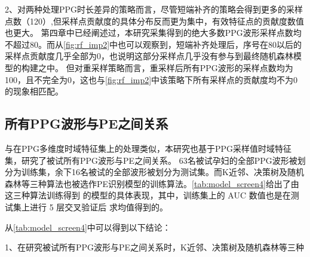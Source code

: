 2、对两种处理PPG时长差异的策略而言，尽管短端补齐的策略会得到更多的采样点数（120）,但采样点贡献度的具体分布反而更为集中，有效特征点的贡献度数值也更大。
第四章中已经阐述过，本研究采集得到的绝大多数PPG波形采样点数均不超过80。而从\autoref{fig:rf_imp2}中也可以观察到，短端补齐处理后，序号在80以后的采样点贡献度几乎全部为0，也说明这部分采样点几乎没有参与到最终随机森林模型的构建之中。
但对重采样策略而言，重采样后所有PPG波形的采样点数均为100，且不完全为0，这也与\autoref{fig:rf_imp2}中该策略下所有采样点的贡献度均不为0的现象相匹配。

\subsection{所有PPG波形与PE之间关系}

与在PPG多维度时域特征集上的处理类似，本研究也基于PPG采样值时域特征集，研究了被试所有PPG波形与PE之间关系。
63名被试孕妇的全部PPG波形被划分为训练集，余下16名被试的全部波形被划分为测试集。而K近邻、决策树及随机森林等三种算法也被选作PE识别模型的训练算法。\autoref{tab:model_screen4}给出了由这三种算法训练得到
的模型的具体表现，其中，训练集上的 AUC 数值也是在测试集上进行 5 层交叉验证后
求均值得到的。

从\autoref{tab:model_screen4}中可以得到以下结论：

1、在研究被试所有PPG波形与PE之间关系时，K近邻、决策树及随机森林等三种

